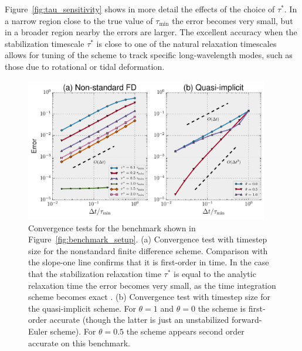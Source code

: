 \documentclass[preprint,12pt,authoryear]{elsarticle}
\begin{document}
Figure~\ref{fig:tau_sensitivity} shows in more detail the effects of the choice of $\tau^*$. In a narrow region 
close to the true value of $\tau_\mathrm{min}$ the error becomes very small, but in a broader region nearby 
the errors are larger. 
The excellent accuracy when the stabilization timescale $\tau^*$ is close to one of the natural relaxation
timescales allows for tuning of the scheme to track specific long-wavelength modes, such as 
those due to rotational or tidal deformation.

\begin{figure}
\includegraphics[width=0.95\textwidth]{figures/timestep_convergence.pdf}
\caption{Convergence tests for the benchmark shown in Figure~\ref{fig:benchmark_setup}. (a) Convergence test with timestep size for the nonstandard finite difference scheme. Comparison with the slope-one line confirms that it is first-order in time. In the case that the stabilization relaxation time $\tau^*$ is equal to the analytic relaxation time the error becomes very small, as the time integration scheme becomes exact \citep{mickens2002nonstandard}. (b) Convergence test with timestep size for the quasi-implicit scheme. For $\theta = 1$ and $\theta = 0$ the scheme is first-order accurate (though the latter is just an unstabilized forward-Euler scheme). For $\theta=0.5$ the scheme appears second order accurate on this benchmark.}
\label{fig:timestep_convergence}
\end{figure}
\end{document}
